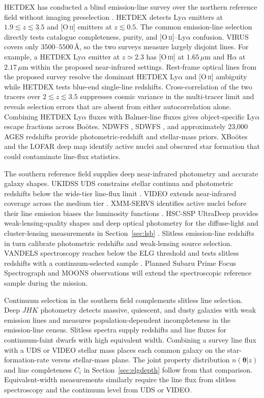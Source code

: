 HETDEX has conducted a blind emission-line survey over the northern reference field without imaging preselection \cite{hetdex2021}. HETDEX detects Ly$\alpha$ emitters at $1.9\lesssim z\lesssim3.5$ and [O\,\textsc{ii}] emitters at $z\lesssim0.5$. The common emission-line selection directly tests catalogue completeness, purity, and [O\,\textsc{ii}]--Ly$\alpha$ confusion. VIRUS covers only $3500$--$5500$\,\AA, so the two surveys measure largely disjoint lines. For example, a HETDEX Ly$\alpha$ emitter at $z\simeq2.3$ has [O\,\textsc{iii}] at $1.65\,\mu$m and H$\alpha$ at $2.17\,\mu$m within the proposed near-infrared settings. Rest-frame optical lines from the proposed survey resolve the dominant HETDEX Ly$\alpha$ and [O\,\textsc{ii}] ambiguity while HETDEX tests blue-end single-line redshifts. Cross-correlation of the two tracers over $2\lesssim z\lesssim3.5$ suppresses cosmic variance in the multi-tracer limit \cite{mcdonaldseljak2009} and reveals selection errors that are absent from either autocorrelation alone. Combining HETDEX Ly$\alpha$ fluxes with Balmer-line fluxes gives object-specific Ly$\alpha$ escape fractions across Bo\"otes. NDWFS \cite{jannuzi1999}, SDWFS \cite{ashby2009}, and approximately 23{,}000 AGES redshifts \cite{kochanek2012} provide photometric-redshift and stellar-mass priors. XBo\"otes \cite{murray2005} and the LOFAR deep map \cite{tasse2021} identify active nuclei and obscured star formation that could contaminate line-flux statistics.

The southern reference field supplies deep near-infrared photometry and accurate galaxy shapes. UKIDSS UDS constrains stellar continua and photometric redshifts below the wide-tier line-flux limit \cite{lawrence2007}. VIDEO extends near-infrared coverage across the medium tier \cite{jarvis2013}. XMM-SERVS identifies active nuclei before their line emission biases the luminosity functions \cite{chen2018}. HSC-SSP UltraDeep provides weak-lensing-quality shapes and deep optical photometry for the diffuse-light and cluster-lensing measurements in Section~\ref{sec:lsb} \cite{aihara2018}. Slitless emission-line redshifts in turn calibrate photometric redshifts and weak-lensing source selection. VANDELS spectroscopy reaches below the ELG threshold and tests slitless redshifts with a continuum-selected sample \cite{mclure2018}. Planned Subaru Prime Focus Spectrograph \cite{takada2014} and MOONS observations will extend the spectroscopic reference sample during the mission.

Continuum selection in the southern field complements slitless line selection. Deep $JHK$ photometry detects massive, quiescent, and dusty galaxies with weak emission lines and measures population-dependent incompleteness in the emission-line census. Slitless spectra supply redshifts and line fluxes for continuum-faint dwarfs with high equivalent width. Combining a survey line flux with a UDS or VIDEO stellar mass places each common galaxy on the star-formation-rate versus stellar-mass plane. The joint property distribution $n(\boldsymbol{\theta}|z)$ and line completeness $C_i$ in Section~\ref{sec:elgdepth} follow from that comparison. Equivalent-width measurements similarly require the line flux from slitless spectroscopy and the continuum level from UDS or VIDEO.

